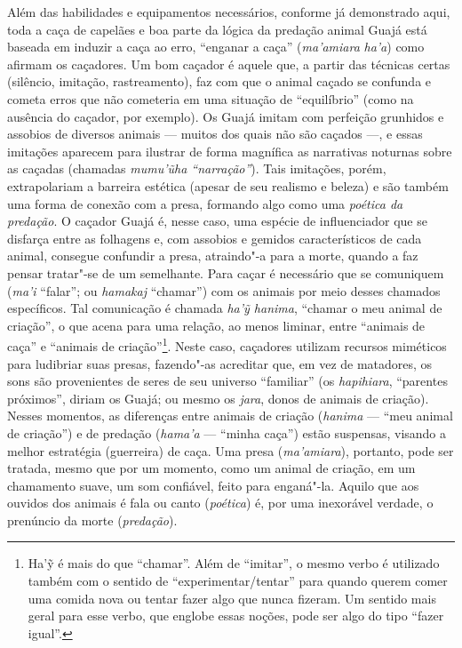 Além das habilidades e equipamentos necessários, conforme já demonstrado
aqui, toda a caça de capelães e boa parte da lógica da predação animal
Guajá está baseada em induzir a caça ao erro, ``enganar a caça''
(\emph{ma'amiara} \emph{ha'a}) como afirmam os caçadores. Um bom caçador
é aquele que, a partir das técnicas certas (silêncio, imitação,
rastreamento), faz com que o animal caçado se confunda e cometa erros
que não cometeria em uma situação de ``equilíbrio'' (como na ausência do
caçador, por exemplo). Os Guajá imitam com perfeição grunhidos e
assobios de diversos animais --- muitos dos quais não são caçados ---, e
essas imitações aparecem para ilustrar de forma magnífica as narrativas
noturnas sobre as caçadas (chamadas \emph{mumu'ũha ``narração''}). Tais
imitações, porém, extrapolariam a barreira estética (apesar de seu
realismo e beleza) e são também uma forma de conexão com a presa,
formando algo como uma \emph{poética da predação}. O caçador Guajá é,
nesse caso, uma espécie de influenciador que se disfarça entre as
folhagens e, com assobios e gemidos característicos de cada animal,
consegue confundir a presa, atraindo"-a para a morte, quando a faz pensar
tratar"-se de um semelhante. Para caçar é necessário que se comuniquem
(\emph{ma'i} ``falar''; ou \emph{hamakaj} ``chamar'') com os animais por
meio desses chamados específicos. Tal comunicação é chamada \emph{ha'ỹ
hanima}, ``chamar o meu animal de criação'', o que acena para uma relação,
ao menos liminar, entre ``animais de caça'' e ``animais de
criação''\footnote{Ha'ỹ é mais do que ``chamar''. Além de ``imitar'', o
  mesmo verbo é utilizado também com o sentido de
  ``experimentar/tentar'' para quando querem comer uma comida nova ou
  tentar fazer algo que nunca fizeram. Um sentido mais geral para esse
  verbo, que englobe essas noções, pode ser algo do tipo ``fazer
  igual''.}. Neste caso, caçadores utilizam recursos miméticos para
ludibriar suas presas, fazendo"-as acreditar que, em vez de matadores, os
sons são provenientes de seres de seu universo ``familiar'' (os
\emph{hapihiara}, ``parentes próximos'', diriam os Guajá; ou mesmo os
\emph{jara}, donos de animais de criação). Nesses momentos, as
diferenças entre animais de criação (\emph{hanima} --- ``meu animal de
criação'') e de predação (\emph{hama'a} --- ``minha caça'') estão suspensas,
visando a melhor estratégia (guerreira) de caça. Uma presa
(\emph{ma'amiara}), portanto, pode ser tratada, mesmo que por um
momento, como um animal de criação, em um chamamento suave, um som
confiável, feito para enganá"-la. Aquilo que aos ouvidos dos animais é
fala ou canto (\emph{poética}) é, por uma inexorável verdade, o
prenúncio da morte (\emph{predação}).

